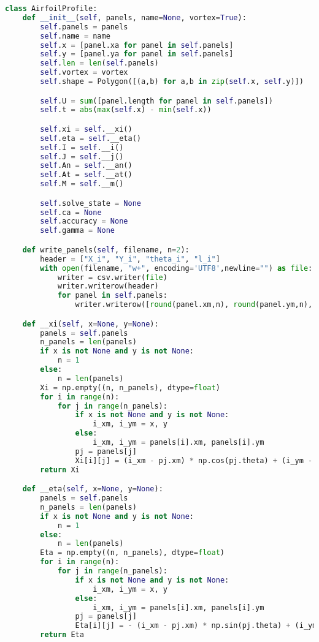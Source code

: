 \begin{lstlisting}[language=Python]
class AirfoilProfile:
    def __init__(self, panels, name=None, vortex=True):
        self.panels = panels
        self.name = name
        self.x = [panel.xa for panel in self.panels]
        self.y = [panel.ya for panel in self.panels]
        self.len = len(self.panels)
        self.vortex = vortex
        self.shape = Polygon([(a,b) for a,b in zip(self.x, self.y)])

        self.U = sum([panel.length for panel in self.panels])
        self.t = abs(max(self.x) - min(self.x))

        self.xi = self.__xi()
        self.eta = self.__eta()
        self.I = self.__i()
        self.J = self.__j()
        self.An = self.__an()
        self.At = self.__at()
        self.M = self.__m()

        self.solve_state = None
        self.ca = None
        self.accuracy = None
        self.gamma = None

    def write_panels(self, filename, n=2):
        header = ["X_i", "Y_i", "theta_i", "l_i"]
        with open(filename, "w+", encoding='UTF8',newline="") as file:
            writer = csv.writer(file)
            writer.writerow(header)
            for panel in self.panels:
                writer.writerow([round(panel.xm,n), round(panel.ym,n), round(panel.theta*180/np.pi,n), round(panel.length,n)])

    def __xi(self, x=None, y=None):
        panels = self.panels
        n_panels = len(panels)
        if x is not None and y is not None:
            n = 1
        else:
            n = len(panels)
        Xi = np.empty((n, n_panels), dtype=float)
        for i in range(n):
            for j in range(n_panels):
                if x is not None and y is not None:
                    i_xm, i_ym = x, y
                else:
                    i_xm, i_ym = panels[i].xm, panels[i].ym
                pj = panels[j]
                Xi[i][j] = (i_xm - pj.xm) * np.cos(pj.theta) + (i_ym - pj.ym) * np.sin(pj.theta)
        return Xi

    def __eta(self, x=None, y=None):
        panels = self.panels
        n_panels = len(panels)
        if x is not None and y is not None:
            n = 1
        else:
            n = len(panels)
        Eta = np.empty((n, n_panels), dtype=float)
        for i in range(n):
            for j in range(n_panels):
                if x is not None and y is not None:
                    i_xm, i_ym = x, y
                else:
                    i_xm, i_ym = panels[i].xm, panels[i].ym
                pj = panels[j]
                Eta[i][j] = - (i_xm - pj.xm) * np.sin(pj.theta) + (i_ym - pj.ym) * np.cos(pj.theta)
        return Eta


\end{lstlisting}

